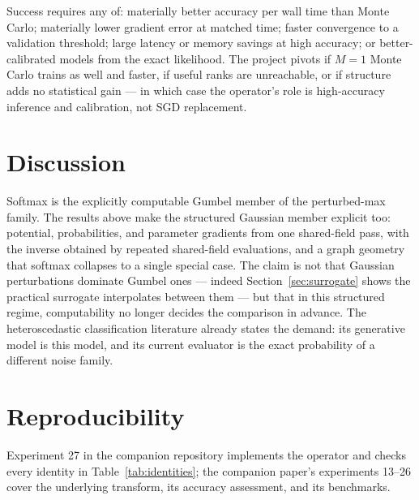 \documentclass[11pt]{article}
\theoremstyle{remark}
\begin{document}
Success requires any of: materially better accuracy per wall time than
Monte Carlo; materially lower gradient error at matched time; faster
convergence to a validation threshold; large latency or memory savings
at high accuracy; or better-calibrated models from the exact
likelihood. The project pivots if $M=1$ Monte Carlo trains as well and
faster, if useful ranks are unreachable, or if structure adds no
statistical gain --- in which case the operator's role is high-accuracy
inference and calibration, not SGD replacement.

\section{Discussion}

Softmax is the explicitly computable Gumbel member of the perturbed-max
family. The results above make the structured Gaussian member explicit
too: potential, probabilities, and parameter gradients from one
shared-field pass, with the inverse obtained by repeated shared-field
evaluations, and a graph geometry that softmax collapses to a single
special case. The claim is not that Gaussian perturbations dominate
Gumbel ones --- indeed Section~\ref{sec:surrogate} shows the practical
surrogate interpolates between them --- but that in this structured
regime, computability no longer decides the comparison in advance. The
heteroscedastic classification literature already states the demand:
its generative model is this model, and its current evaluator is the
exact probability of a different noise family.

\section*{Reproducibility}

Experiment 27 in the companion repository implements the operator and
checks every identity in Table~\ref{tab:identities}; the companion
paper's experiments 13--26 cover the underlying transform, its
accuracy assessment, and its benchmarks.
\end{document}
